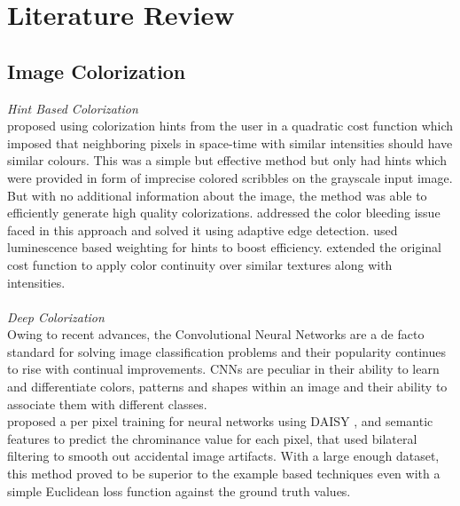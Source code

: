 \documentclass[conference]{IEEEtran}
\begin{document}
\section{Literature Review}
\subsection{Image Colorization}
\textit{Hint Based Colorization}\\
\hspace*{0.25 in}\citet{levin2004colorization} proposed using colorization hints from the user in a quadratic cost function which imposed that neighboring pixels in space-time with similar intensities should have similar colours. This was a simple but effective method but only had hints which were provided in form of imprecise colored scribbles on the grayscale input image. But with no additional information about the image, the method was able to efficiently generate high quality colorizations. \cite{huang2005edge} addressed the color bleeding issue faced in this approach and solved it using adaptive edge detection. \cite{yatziv2006chrominance} used luminescence based weighting for hints to boost efficiency. \cite{qu2006manga} extended the original cost function to apply color continuity over similar textures along with intensities.\\ \\
\hspace*{0.1 in}\textit{Deep Colorization}\\
\hspace*{0.25 in}Owing to recent advances, the Convolutional Neural Networks are a de facto standard for solving image classification problems and their popularity continues to rise with continual improvements. CNNs are peculiar in their ability to learn and differentiate colors, patterns and shapes within an image and their ability to associate them with different classes.\\
\hspace*{0.25 in}\cite{cheng2016deep} proposed a per pixel training for neural networks using DAISY \citep{tola2008descriptor}, and semantic \citep{long2015semantic} features to predict the chrominance value for each pixel, that used bilateral filtering to smooth out accidental image artifacts. With a large enough dataset, this method proved to be superior to the example based techniques even with a simple Euclidean loss function against the ground truth values.\\
\end{document}
